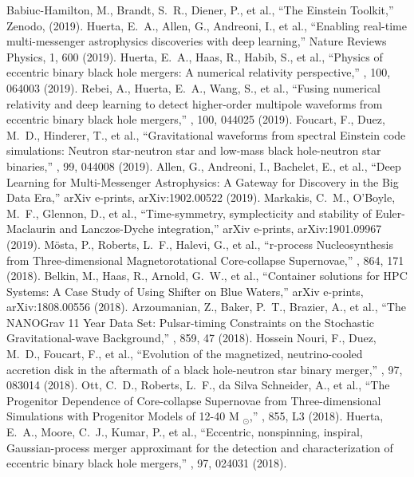  Babiuc-Hamilton, M., Brandt, S.~R., Diener, P., et al., ``The Einstein Toolkit,'' Zenodo, (2019).
 Huerta, E.~A., Allen, G., Andreoni, I., et al., ``Enabling real-time multi-messenger astrophysics discoveries with deep learning,'' Nature Reviews Physics, 1, 600 (2019).
 Huerta, E.~A., Haas, R., Habib, S., et al., ``Physics of eccentric binary black hole mergers: A numerical relativity perspective,'' \prd, 100, 064003 (2019).
 Rebei, A., Huerta, E.~A., Wang, S., et al., ``Fusing numerical relativity and deep learning to detect higher-order multipole waveforms from eccentric binary black hole mergers,'' \prd, 100, 044025 (2019).
 Foucart, F., Duez, M.~D., Hinderer, T., et al., ``Gravitational waveforms from spectral Einstein code simulations: Neutron star-neutron star and low-mass black hole-neutron star binaries,'' \prd, 99, 044008 (2019).
 Allen, G., Andreoni, I., Bachelet, E., et al., ``Deep Learning for Multi-Messenger Astrophysics: A Gateway for Discovery in the Big Data Era,'' arXiv e-prints, arXiv:1902.00522 (2019).
 Markakis, C.~M., O'Boyle, M.~F., Glennon, D., et al., ``Time-symmetry, symplecticity and stability of Euler-Maclaurin and Lanczos-Dyche integration,'' arXiv e-prints, arXiv:1901.09967 (2019).
 M{\"o}sta, P., Roberts, L.~F., Halevi, G., et al., ``r-process Nucleosynthesis from Three-dimensional Magnetorotational Core-collapse Supernovae,'' \apj, 864, 171 (2018).
 Belkin, M., Haas, R., Arnold, G.~W., et al., ``Container solutions for HPC Systems: A Case Study of Using Shifter on Blue Waters,'' arXiv e-prints, arXiv:1808.00556 (2018).
 Arzoumanian, Z., Baker, P.~T., Brazier, A., et al., ``The NANOGrav 11 Year Data Set: Pulsar-timing Constraints on the Stochastic Gravitational-wave Background,'' \apj, 859, 47 (2018).
 Hossein Nouri, F., Duez, M.~D., Foucart, F., et al., ``Evolution of the magnetized, neutrino-cooled accretion disk in the aftermath of a black hole-neutron star binary merger,'' \prd, 97, 083014 (2018).
 Ott, C.~D., Roberts, L.~F., da Silva Schneider, A., et al., ``The Progenitor Dependence of Core-collapse Supernovae from Three-dimensional Simulations with Progenitor Models of 12-40 M $_{{\ensuremath{\odot}}}$,'' \apjl, 855, L3 (2018).
 Huerta, E.~A., Moore, C.~J., Kumar, P., et al., ``Eccentric, nonspinning, inspiral, Gaussian-process merger approximant for the detection and characterization of eccentric binary black hole mergers,'' \prd, 97, 024031 (2018).
